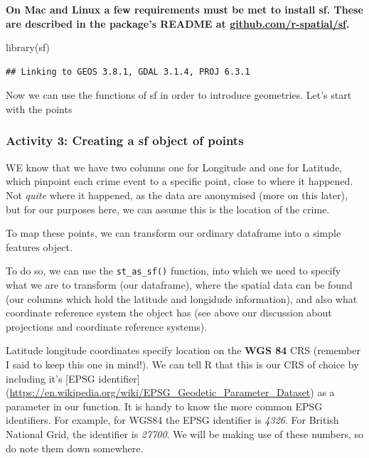 \documentclass[
]{book}
\newenvironment{Shaded}{\begin{snugshade}}{\end{snugshade}}
\newcommand{\FunctionTok}[1]{\textcolor[rgb]{0.00,0.00,0.00}{#1}}
\newcommand{\NormalTok}[1]{#1}
\begin{document}
\textbf{On Mac and Linux a few requirements must be met to install sf. These are described in the package's README at \url{github.com/r-spatial/sf}.}

\begin{Shaded}
\begin{Highlighting}[]
\FunctionTok{library}\NormalTok{(sf)}
\end{Highlighting}
\end{Shaded}

\begin{verbatim}
## Linking to GEOS 3.8.1, GDAL 3.1.4, PROJ 6.3.1
\end{verbatim}

Now we can use the functions of sf in order to introduce geometries. Let's start with the points

\hypertarget{activity-3-creating-a-sf-object-of-points}{%
\subsubsection{Activity 3: Creating a sf object of points}\label{activity-3-creating-a-sf-object-of-points}}

WE know that we have two columns one for Longitude and one for Latitude, which pinpoint each crime event to a specific point, close to where it happened. Not \emph{quite} where it happened, as the data are anonymised (more on this later), but for our purposes here, we can assume this is the location of the crime.

To map these points, we can transform our ordinary dataframe into a simple features object.

To do so, we can use the \texttt{st\_as\_sf()} function, into which we need to specify what we are to transform (our dataframe), where the spatial data can be found (our columns which hold the latitude and longidude information), and also what coordinate reference system the object has (see above our discussion about projections and coordinate reference systems).

Latitude longitude coordinates specify location on the \textbf{WGS 84} CRS (remember I said to keep this one in mind!). We can tell R that this is our CRS of choice by including it's {[}EPSG identifier{]}
(\url{https://en.wikipedia.org/wiki/EPSG_Geodetic_Parameter_Dataset}) as a parameter in our function. It is handy to know the more common EPSG identifiers. For example, for WGS84 the EPSG identifier is \emph{4326}. For British National Grid, the identifier is \emph{27700}. We will be making use of these numbers, so do note them down somewhere.
\end{document}
